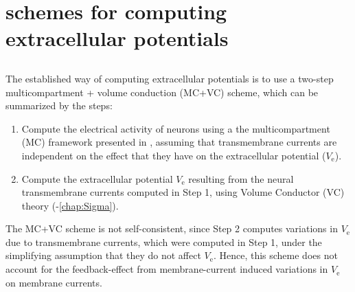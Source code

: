 \chapter{ schemes for computing extracellular potentials}
\label{sec:LFPy}



\section{}
\label{sec:LFPy:introduction}

The established way of computing extracellular potentials is to use a two-step multicompartment + volume conduction (MC+VC) scheme, which can be summarized by the steps:
%
\begin{enumerate}
\item Compute the electrical activity of neurons using a the multicompartment (MC) framework presented in , assuming that transmembrane currents are independent on the effect that they have on the extracellular potential ($V_\text{e}$).

\item Compute the extracellular potential $V_\text{e}$ resulting from the neural transmembrane currents computed in Step 1, using Volume Conductor (VC) theory (-\ref{chap:Sigma}).
\end{enumerate}

The MC+VC scheme is not self-consistent, since Step 2 computes variations in $V_\text{e}$ due to transmembrane currents, 
which were computed in Step 1, under the simplifying assumption that they do not affect $V_\text{e}$. 
Hence, this scheme does not account for the feedback-effect from membrane-current induced variations in $V_\text{e}$ on membrane currents.

